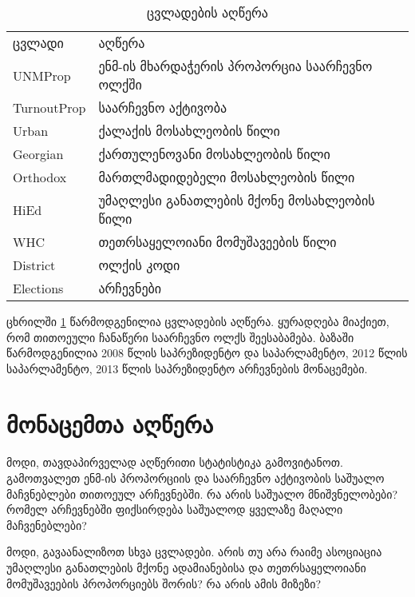 \documentclass{article}\usepackage[]{graphicx}\usepackage[]{color}
\begin{document}
\begin{table}[]
\centering
\caption{ცვლადების აღწერა}
\label{lab1}
\begin{tabular}{ll}
ცვლადი    & აღწერა                                                      \\
UNMProp     & ენმ-ის მხარდაჭერის პროპორცია საარჩევნო ოლქში                            \\
TurnoutProp & საარჩევნო აქტივობა                                         \\
Urban       & ქალაქის მოსახლეობის წილი                                  \\
Georgian    & ქართულენოვანი მოსახლეობის წილი                                 \\
Orthodox    & მართლმადიდებელი მოსახლეობის წილი                               \\
HiEd        & უმაღლესი განათლების მქონე მოსახლეობის წილი                  \\
WHC         & თეთრსაყელოიანი მომუშავეების წილი \\
District    & ოლქის კოდი                                                     \\
Elections   & არჩევნები                                                  
\end{tabular}
\end{table}

ცხრილში \ref{lab1} წარმოდგენილია ცვლადების აღწერა. ყურადღება მიაქიეთ, რომ თითოეული ჩანაწერი საარჩევნო ოლქს შეესაბამება. ბაზაში წარმოდგენილია 2008 წლის საპრეზიდენტო და საპარლამენტო, 2012 წლის საპარლამენტო, 2013 წლის საპრეზიდენტო არჩევნების მონაცემები.

\section*{მონაცემთა აღწერა}
\paragraph{}

მოდი, თავდაპირველად აღწერითი სტატისტიკა გამოვიტანოთ. გამოთვალეთ ენმ-ის პროპორციის და საარჩევნო აქტივობის საშუალო მაჩვნებლები თითოეულ არჩევნებში. რა არის საშუალო მნიშვნელობები? რომელ არჩევნებში ფიქსირდება საშუალოდ ყველაზე მაღალი მაჩვენებლები?

მოდი, გავაანალიზოთ სხვა ცვლადები. არის თუ არა რაიმე ასოციაცია უმაღლესი განათლების მქონე ადამიანებისა და თეთრსაყელოიანი მომუშავეების პროპორციებს შორის? რა არის ამის მიზეზი?
\end{document}
